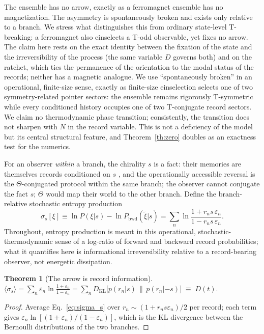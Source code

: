 \documentclass[11pt]{article}
\newtheorem{theorem}{Theorem}
\newcommand{\KL}{D_{\mathrm{KL}}}
\begin{document}
The ensemble has no arrow, exactly as a ferromagnet ensemble has no magnetization. The asymmetry is spontaneously broken and exists only relative to a branch. We stress what distinguishes this from ordinary state-level T-breaking: a ferromagnet also einselects a T-odd observable, yet fixes no arrow. The claim here rests on the exact identity between the fixation of the state and the irreversibility of the process (the same variable $D$ governs both) and on the ratchet, which ties the permanence of the orientation to the modal status of the records; neither has a magnetic analogue. We use ``spontaneously broken'' in an operational, finite-size sense, exactly as finite-size einselection selects one of two symmetry-related pointer sectors: the ensemble remains rigorously T-symmetric while every conditioned history occupies one of two T-conjugate record sectors. We claim no thermodynamic phase transition; consistently, the transition does not sharpen with $N$ in the record variable. This is not a deficiency of the model but its central structural feature, and Theorem~\ref{th:zero} doubles as an exactness test for the numerics.

For an observer \emph{within} a branch, the chirality $s$ is a fact: their memories are themselves records conditioned on $s$ \cite{Mlodinow2014}, and the operationally accessible reversal is the $\Theta$-conjugated protocol within the same branch; the observer cannot conjugate the fact $s$; $\Theta$ would map their world to the other branch. Define the branch-relative stochastic entropy production
\begin{equation}
\sigma_s[\xi] \equiv \ln P(\xi|s) - \ln P_{\mathrm{bwd}}(\tilde\xi|s)
= \sum_n \ln\frac{1+r_n s\,\varepsilon_n}{1-r_n s\,\varepsilon_n}.
\label{eq:sigma_s}
\end{equation} Throughout, entropy production is meant in this operational, stochastic-thermodynamic sense of a log-ratio of forward and backward record probabilities; what it quantifies here is informational irreversibility relative to a record-bearing observer, not energetic dissipation.

\begin{theorem}[The arrow is record information]\label{th:identity}
$\displaystyle \langle\sigma_s\rangle
= \sum_n \varepsilon_n\ln\frac{1+\varepsilon_n}{1-\varepsilon_n}
= \sum_n \KL\!\big[p(r_n|s)\,\big\|\,p(r_n|{-}s)\big] \;\equiv\; D(t) .$
\end{theorem}

\begin{proof}
Average Eq.~\eqref{eq:sigma_s} over $r_n\sim(1{+}r_ns\varepsilon_n)/2$ per record; each term gives $\varepsilon_n\ln[(1{+}\varepsilon_n)/(1{-}\varepsilon_n)]$, which is the KL divergence between the Bernoulli distributions of the two branches.
\end{proof}
\end{document}
